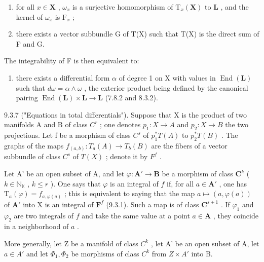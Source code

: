\begin{enumerate}
\def\labelenumi{\alph{enumi})}
\item
  for all \(x \in \mathbf{X}\) , \(\omega_x\) is a surjective homomorphism of \(\mathrm{T}_x(\mathbf{X})\) to \(\mathbf{L}\) , and the kernel of \(\omega_x\) is \(\mathrm{F}_x\) ;
\item
  there exists a vector subbundle G of T(X) such that T(X) is the direct sum of F and G.
\end{enumerate}

The integrability of F is then equivalent to:

\begin{enumerate}
\def\labelenumi{(\roman{enumi})}
\setcounter{enumi}{8}
\tightlist
\item
  there exists a differential form \(\alpha\) of degree 1 on X with values in \(\operatorname{End}(\mathbf{L})\) such that \(d\omega = \alpha \wedge \omega\) , the exterior product being defined by the canonical pairing \(\operatorname{End}(\mathbf{L}) \times \mathbf{L} \to \mathbf{L}\) (7.8.2 and 8.3.2).
\end{enumerate}

9.3.7 ("Equations in total differentials"). Suppose that X is the product of two manifolds A and B of class \(C^{r}\) ; one denotes \(p_{1}: X \to A\) and \(p_{2}: X \to B\) the two projections. Let f be a morphism of class \(C^{s}\) of \(p_{1}^{*}T(A)\) to \(p_{2}^{*}T(B)\) . The graphs of the maps \(f_{(a,b)}: T_{a}(A) \to T_{b}(B)\) are the fibers of a vector subbundle of class \(C^{s}\) of \(T(X)\) ; denote it by \(F^{f}\) .

Let A' be an open subset of A, and let \(\varphi: \mathbf{A}' \to \mathbf{B}\) be a morphism of class \(\mathbf{C}^k\) ( \(k \in \mathbb{N}_{\mathbb{K}}\) , \(k \leqslant r\) ). One says that \(\varphi\) is an integral of \(f\) if, for all \(a \in \mathbf{A}'\) , one has \(\mathrm{T}_a(\varphi) = f_{a,\varphi(a)}\) ; this is equivalent to saying that the map \(a \mapsto (a, \varphi(a))\) of \(\mathbf{A}'\) into X is an integral of \(\mathbf{F}^f\) (9.3.1). Such a map is of class \(\mathbf{C}^{s+1}\) . If \(\varphi_1\) and \(\varphi_2\) are two integrals of \(f\) and take the same value at a point \(a \in \mathbf{A}\) , they coincide in a neighborhood of \(a\) .

More generally, let Z be a manifold of class \(C^{k}\) , let A' be an open subset of A, let \(a \in A'\) and let \(\Phi_{1}, \Phi_{2}\) be morphisms of class \(C^{k}\) from \(Z \times A'\) into B.


